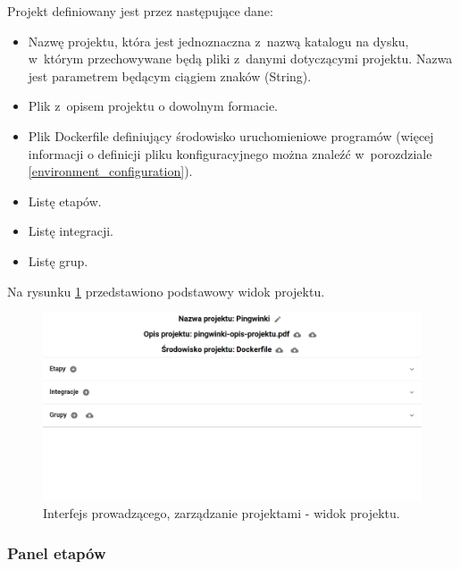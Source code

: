 Projekt definiowany jest przez następujące dane:
\begin {itemize}
    \item Nazwę projektu, która jest jednoznaczna z~nazwą katalogu na dysku, w~którym przechowywane będą pliki z~danymi dotyczącymi projektu.
    Nazwa jest parametrem będącym ciągiem znaków (String).
    \item Plik z~opisem projektu o dowolnym formacie.
    \item Plik Dockerfile definiujący środowisko uruchomieniowe programów (więcej informacji o definicji pliku konfiguracyjnego można znaleźć w~porozdziale \ref{environment_configuration}).
    \item Listę etapów.
    \item Listę integracji.
    \item Listę grup.
\end {itemize}

Na rysunku \ref{fig:lecturer_project_board} przedstawiono podstawowy widok projektu.

\begin{figure}[h]
    \centering
    \includegraphics[width = 16cm]{chapter04/lecturer_project_board.png}
    \caption{Interfejs prowadzącego, zarządzanie projektami - widok projektu.}
    \label{fig:lecturer_project_board}
\end{figure}

\subsubsection{Panel etapów}

